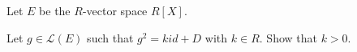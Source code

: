 Let $E$ be the $R$-vector space $R[X]$.

Let $g \in \mathcal{L}(E)$ such that $g^2 = k id + D$ with $k \in R$. Show that $k > 0$.
